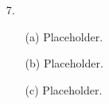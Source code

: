 \documentclass[11pt]{article}
\begin{document}
\begin{itemize}
    \item[7.]
        \begin{itemize}
            \item[(a)]
                Placeholder.

            \item[(b)]
                Placeholder.

            \item[(c)]
                Placeholder.
        \end{itemize}
\end{itemize}

\end{document}
